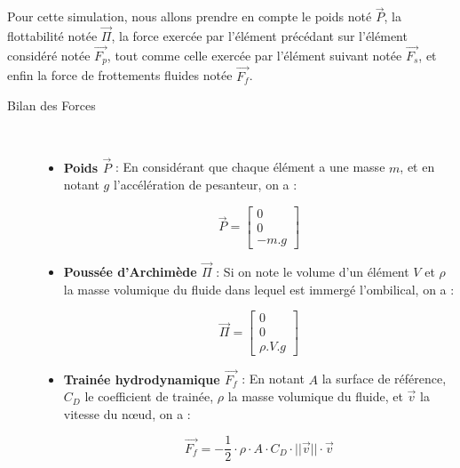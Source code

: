 				Pour cette simulation, nous allons prendre en compte le poids noté $\overrightarrow{P}$, la flottabilité notée $\overrightarrow{\Pi}$, la force exercée par l'élément précédant sur l'élément considéré notée $\overrightarrow{F_p}$, tout comme celle exercée par l'élément suivant notée $\overrightarrow{F_s}$, et enfin la force de frottements fluides notée $\overrightarrow{F_f}$.
				
				\begin{description}
					\item [Bilan des Forces] \
					\begin{itemize}
						\item[\textbullet] \textbf{Poids $\overrightarrow{P}$} : En considérant que chaque élément a une masse $m$, et en notant $g$ l'accélération de pesanteur, on a : 
						
						\begin{equation}
							\overrightarrow{P} = \begin{bmatrix}0\\ 0\\ -m.g\end{bmatrix}
							\label{eq:poids}
						\end{equation}
				
						\item[\textbullet] \textbf{Poussée d'Archimède $\overrightarrow{\Pi}$} : Si on note le volume d'un élément $V$ et $\rho$ la masse volumique du fluide dans lequel est immergé l'ombilical, on a : 
						
						\begin{equation}
							\overrightarrow{\Pi} = \begin{bmatrix}0\\ 0\\ \rho.V.g\end{bmatrix}
							\label{eq:archimede}
						\end{equation}
				
						\item[\textbullet] \textbf{Trainée hydrodynamique $\overrightarrow{F_f}$} : En notant $A$ la surface de référence, $C_D$ le coefficient de trainée, $\rho$ la masse volumique du fluide, et $\overrightarrow{v}$ la vitesse du n\oe ud, on a : 
					
						\begin{equation}
							\overrightarrow{F_f} = - \frac{1}{2} \cdot \rho \cdot A \cdot C_D \cdot ||\overrightarrow{v}|| \cdot \overrightarrow{v}
							\label{eq:drag}
						\end{equation}
						

\end{itemize}
\end{description}
